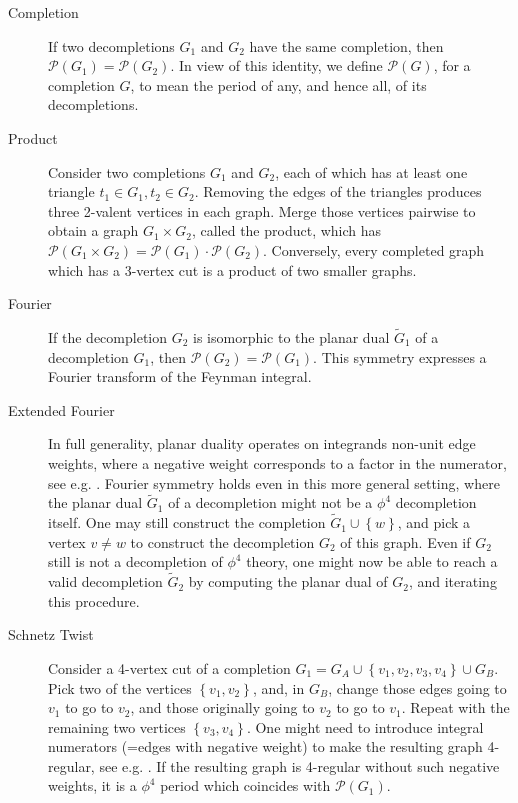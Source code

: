 \documentclass[12pt,a4paper]{article}
\newcommand{\period}{\mathcal P}
\renewcommand{\|}{\rule[-0.4ex]{0.2ex}{1.2em}}
\begin{document}
\begin{description}
	\item[Completion] \cite{schnetz_quantum_2010} If two decompletions $G_1$ and $G_2$ have the same completion, then    $\period(G_1)=\period(G_2)$. In view of this identity, we define $\period(G)$, for a completion $G$, to mean the period of any, and hence all, of its decompletions.
	\item[Product] \cite{schnetz_quantum_2010} Consider two completions $G_1$ and $G_2$, each of which has at least one triangle $t_1\in G_1,t_2\in G_2$. Removing the edges of the triangles produces three 2-valent vertices in each graph. Merge those vertices pairwise to obtain a graph $G_1 \times G_2$, called the product, which has $\period(G_1\times G_2)=\period(G_1) \cdot \period(G_2)$. Conversely, every completed graph which has a 3-vertex cut is a product of two smaller graphs. 
	\item[Fourier] \cite{broadhurst_exploiting_1986} If the decompletion $G_2$ is isomorphic to the planar dual $\tilde G_1$ of a decompletion $G_1$, then $\period(G_2)=\period(G_1)$. This symmetry expresses a Fourier transform of the Feynman integral.
	\item[Extended Fourier]\cite{schnetz_quantum_2010} In full generality,   planar duality operates on integrands non-unit edge weights, where a negative weight corresponds to a factor in the numerator, see e.g. \cite{golz_graphical_2017,borinsky_graphical_2022}.   Fourier symmetry holds even in this more general setting, where the planar dual $\tilde G_1$ of a decompletion might not be  a $\phi^4$ decompletion itself. One may still construct the completion  $\tilde G_1\cup \left \lbrace w \right \rbrace $, and pick a vertex $v\neq w$ to construct the decompletion $G_2$ of this graph. Even if $G_2$ still is not a decompletion of $\phi^4$ theory, one might now be able to reach a valid decompletion $\tilde G_2$ by computing the planar dual of $G_2$, and iterating this procedure. 
	\item[Schnetz Twist]\cite{schnetz_quantum_2010} Consider a 4-vertex cut  of a completion $G_1=G_A \cup \left \lbrace v_1,v_2,v_3,v_4 \right \rbrace \cup G_B$.  Pick two of the vertices $\left \lbrace v_1,v_2 \right \rbrace $, and, in $G_B$, change those edges going to $v_1$ to go to $v_2$, and those originally going to $v_2$ to go to $v_1$. Repeat with the remaining two vertices $\left \lbrace v_3,v_4 \right \rbrace $. One might need to introduce integral numerators (=edges with negative weight) to make the resulting graph 4-regular, see e.g. \cite{borinsky_graphical_2022}. If the resulting graph is 4-regular without such negative weights, it is a $\phi^4$ period which coincides with $\period(G_1)$.

\end{description}
\end{document}
